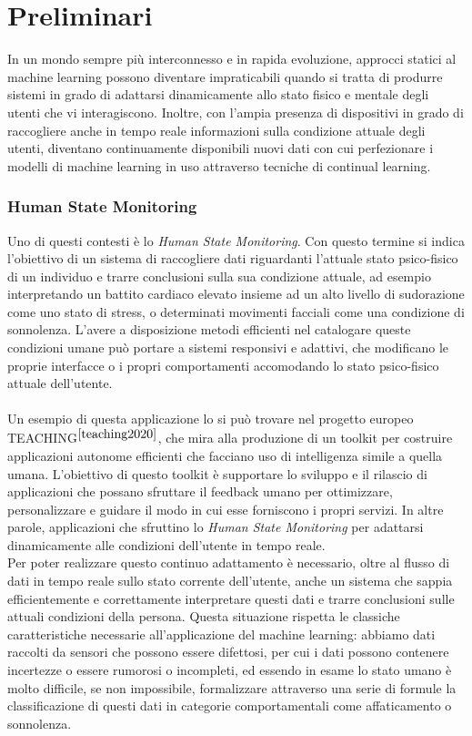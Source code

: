 \chapter{Preliminari}
In un mondo sempre più interconnesso e in rapida evoluzione, approcci statici al machine learning possono diventare impraticabili quando si tratta di produrre sistemi in grado di adattarsi dinamicamente allo stato fisico e mentale degli utenti che vi interagiscono. Inoltre, con l'ampia presenza di dispositivi in grado di raccogliere anche in tempo reale informazioni sulla condizione attuale degli utenti, diventano continuamente disponibili nuovi dati con cui perfezionare i modelli di machine learning in uso attraverso tecniche di continual learning.

\subsection*{Human State Monitoring}
Uno di questi contesti è lo \textit{Human State Monitoring}. Con questo termine si indica l'obiettivo di un sistema di raccogliere dati riguardanti l'attuale stato psico-fisico di un individuo e trarre conclusioni sulla sua condizione attuale, ad esempio interpretando un battito cardiaco elevato insieme ad un alto livello di sudorazione come uno stato di stress, o determinati movimenti facciali come una condizione di sonnolenza. L'avere a disposizione metodi efficienti nel catalogare queste condizioni umane può portare a sistemi responsivi e adattivi, che modificano le proprie interfacce o i propri comportamenti accomodando lo stato psico-fisico attuale dell'utente.\\\\
Un esempio di questa applicazione lo si può trovare nel progetto europeo\\TEACHING$^{\cite{teaching2020}}$, che mira alla produzione di un toolkit per costruire applicazioni autonome efficienti che facciano uso di intelligenza simile a quella umana. L'obiettivo di questo toolkit è supportare lo sviluppo e il rilascio di applicazioni che possano sfruttare il feedback umano per ottimizzare, personalizzare e guidare il modo in cui esse forniscono i propri servizi. In altre parole, applicazioni che sfruttino lo \textit{Human State Monitoring} per adattarsi dinamicamente alle condizioni dell'utente in tempo reale.\\
Per poter realizzare questo continuo adattamento è necessario, oltre al flusso di dati in tempo reale sullo stato corrente dell'utente, anche un sistema che sappia efficientemente e correttamente interpretare questi dati e trarre conclusioni sulle attuali condizioni della persona. Questa situazione rispetta le classiche caratteristiche necessarie all'applicazione del machine learning: abbiamo dati raccolti da sensori che possono essere difettosi, per cui i dati possono contenere incertezze o essere rumorosi o incompleti, ed essendo in esame lo stato umano è molto difficile, se non impossibile, formalizzare attraverso una serie di formule la classificazione di questi dati in categorie comportamentali come affaticamento o sonnolenza.

